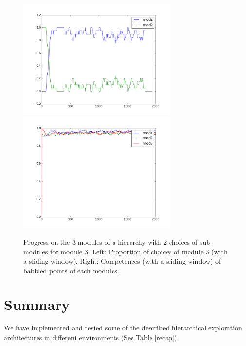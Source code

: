 \documentclass[12pt]{article}
\begin{document}
		\begin{figure}[H]
			\centering
			\includegraphics[width=8cm]{./include/choice_test_choices.png}
			\includegraphics[width=8cm]{./include/choice_test_competences.png}
			\caption{Progress on the 3 modules of a hierarchy with 2 choices of sub-modules for module 3. Left: Proportion of choices of module 3 (with a sliding window). Right: Competences (with a sliding window) of babbled points of each modules.}
			\label{fchoices}
		\end{figure}
		
	


%

\section{Summary}

	\paragraph{}%
	We have implemented and tested some of the described hierarchical exploration architectures in different environments (See Table \ref{recap}).
	
\end{document}
